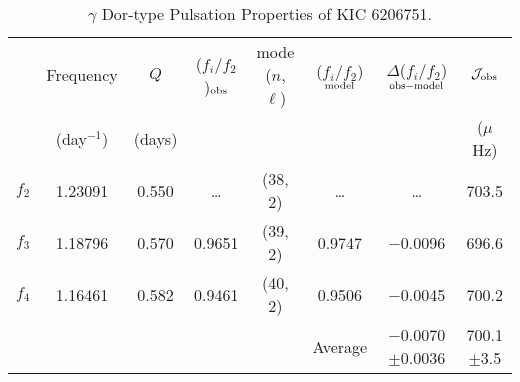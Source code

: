 \documentclass[useAMS,usenatbib,usegraphicx]{mn2e}
\begin{document}
\begin{table}
\caption{$\gamma$ Dor-type Pulsation Properties of KIC 6206751. }
\begin{tabular}{lccccccc}
\hline
         & Frequency      & $Q$      & ($f_i$/$f_2$)$_{\rm obs}$   & mode ($n$, $\ell$)   & ($f_i$/$f_2$)$_{\rm model}$   & $\Delta$($f_i$/$f_2$)$_{\rm obs-model}$    & $\cal J_{\rm obs}$      \\
         & (day$^{-1}$)   & (days)   &                             &                      &                               &                                            & ($\mu$Hz)               \\
\hline
$f_{2}$  & 1.23091   & 0.550  & \dots    & (38, 2)    & \dots    & \dots                 & 703.5            \\
$f_{3}$  & 1.18796   & 0.570  & 0.9651   & (39, 2)    & 0.9747   & $-$0.0096             & 696.6            \\
$f_{4}$  & 1.16461   & 0.582  & 0.9461   & (40, 2)    & 0.9506   & $-$0.0045             & 700.2            \\
         &           &        &          &            & Average  & $-$0.0070$\pm$0.0036  & 700.1$\pm$3.5    \\  
\hline
\end{tabular}
\end{table}


\bsp
\label{lastpage}
\end{document}
